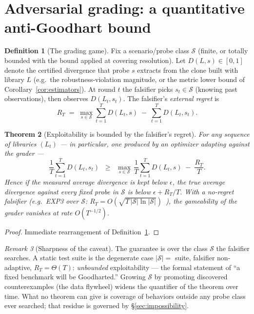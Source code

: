 \documentclass[11pt]{article}
\theoremstyle{plain}
\newtheorem{theorem}{Theorem}[section]
\theoremstyle{definition}
\newtheorem{definition}[theorem]{Definition}
\theoremstyle{remark}
\newtheorem{remark}[theorem]{Remark}
\newcommand{\cS}{\mathcal{S}}
\begin{document}
\section{Adversarial grading: a quantitative anti-Goodhart bound}
\label{sec:adversarial}

\begin{definition}[The grading game]\label{def:game}
Fix a scenario/probe class $\cS$ (finite, or totally bounded with the bound
applied at covering resolution). Let $D(L, s) \in [0,1]$ denote the certified
divergence that probe $s$ extracts from the clone built with library $L$
(e.g.\ the robustness-violation magnitude, or the metric lower bound of
Corollary~\ref{cor:estimators}). At round $t$ the falsifier picks $s_t \in
\cS$ (knowing past observations), then observes $D(L_t, s_t)$. The
falsifier's \emph{external regret} is
\[
  R_T \;=\; \max_{s \in \cS} \sum_{t=1}^T D(L_t, s)
  \;-\; \sum_{t=1}^T D(L_t, s_t).
\]
\end{definition}

\begin{theorem}[Exploitability is bounded by the falsifier's regret]
\label{thm:exploit}
For any sequence of libraries $(L_t)$ --- in particular, one produced by an
optimizer adapting against the grader ---
\[
  \frac1T \sum_{t=1}^T D(L_t, s_t)
  \;\;\ge\;\;
  \max_{s \in \cS}\, \frac1T \sum_{t=1}^T D(L_t, s)
  \;-\; \frac{R_T}{T}.
\]
Hence if the \emph{measured} average divergence is kept below $\epsilon$, the
true average divergence against \emph{every fixed probe in $\cS$} is below
$\epsilon + R_T / T$. With a no-regret falsifier (e.g.\ EXP3 over $\cS$:
$R_T = O(\sqrt{T\, |\cS| \ln |\cS|})$~\cite{exp3}), the gameability of the
grader vanishes at rate $O(T^{-1/2})$.
\end{theorem}

\begin{proof}
Immediate rearrangement of Definition~\ref{def:game}.
\end{proof}

\begin{remark}[Sharpness of the caveat]
The guarantee is over the class $\cS$ the falsifier searches. A static test
suite is the degenerate case $|\cS| = $ suite, falsifier non-adaptive, $R_T =
\Theta(T)$: \emph{unbounded} exploitability --- the formal statement of ``a
fixed benchmark will be Goodharted.'' Growing $\cS$ by promoting discovered
counterexamples (the data flywheel) widens the quantifier of the theorem over
time. What no theorem can give is coverage of behaviors outside any probe
class ever searched; that residue is governed by
\S\ref{sec:impossibility}.
\end{remark}
\end{document}
